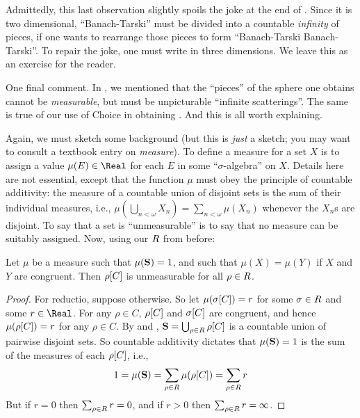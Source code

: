 \documentclass[../../../include/open-logic-section]{subfiles}
\begin{document}
Admittedly, this last observation slightly spoils the joke at the end
of . Since it is  two dimensional,
``Banach-Tarski'' must be divided into a countable \emph{infinity} of
pieces, if one wants to rearrange those pieces to form ``Banach-Tarski
Banach-Tarski''. To repair the joke, one must write in three
dimensions. We leave this as an exercise for the reader.

One final comment. In , we mentioned that the
``pieces'' of the sphere one obtains cannot be \emph{measurable}, but
must be unpicturable ``infinite scatterings''. The same is true of our
use of Choice in obtaining . And this is all
worth explaining.

Again, we must sketch some background (but this is \emph{just} a
sketch; you may want to consult a textbook entry on \emph{measure}).
To define a measure for a set $X$ is to assign a value $\mu(E) \in
\Real$ for each $E$ in some ``$\sigma$-algebra'' on $X$. Details here
are not essential, except that the function $\mu$ must obey the
principle of countable additivity: the measure of a countable union of
disjoint sets is the sum of their individual measures, i.e.,
$\mu(\bigcup_{n < \omega} X_n) = \sum_{n < \omega}\mu(X_n)$ whenever
the $X_n$s are disjoint. To say that a set is ``unmeasurable'' is to
say that no measure can be suitably assigned. Now, using our
$R$ from before:

\begin{cor}[Vitali]
Let $\mu$ be a measure such that $\mu(\mathbf{S}) = 1$, and such that
$\mu(X) = \mu(Y)$ if $X$ and $Y$ are congruent. Then
$\rho[C]$ is unmeasurable for all $\rho \in
R$. 
\end{cor}

\begin{proof}
For reductio, suppose otherwise. So let $\mu(\sigma[C]) =
r$ for some $\sigma \in R$ and some $r \in \Real$. For
any $\rho \in C$, $\rho[C]$ and $\sigma[C]$ are
congruent, and hence  $\mu(\rho[C]) = r$ for any $\rho \in
C$. By  and , $\mathbf{S} =
\bigcup_{\rho \in R}\rho[C]$ is a countable
union of pairwise disjoint sets. So countable additivity dictates that
$\mu(\mathbf{S}) = 1$ is the sum of the measures of each
$\rho[C]$, i.e.,
\[
	1 = \mu(\mathbf{S}) = \sum_{\rho \in R}\mu(\rho[C]) = \sum_{\rho \in R}r
\]
But if $r = 0$ then $\sum_{\rho \in R}r = 0$, and if $r
> 0$ then $\sum_{\rho \in R}r = \infty$. 
\end{proof}
\end{document}
